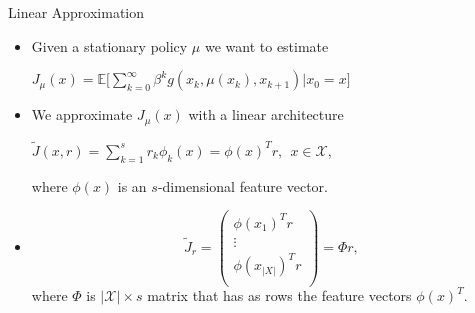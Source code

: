 \documentclass{beamer}
\def\X{{\mathcal X}}
\def\E{{\mathbb E}}
\begin{document}
\begin{frame}{Linear Approximation}

\begin{itemize}
\item Given a stationary policy $\mu$ we want to estimate
\begin{center}
$J_\mu(x) = \E\Big[\sum\limits_{k=0}^\infty \beta^k g(x_k, \mu(x_k), x_{k+1})| x_0 = x \Big]$
\end{center}




\item We approximate $J_\mu(x)$ with a linear architecture 
\begin{center}
$
\tilde J(x, r) = \sum\limits_{k=1}^s r_k \phi_k(x) = \phi(x)^T r,~~x\in \X
  $,
 \end{center} 
  where $\phi(x)$ is an $s$-dimensional feature vector.

\item $$\tilde J_r = \left(
                      \begin{array}{c}
                        \phi(x_1)^T r \\
                        \vdots \\
                        \phi(x_{|X|})^T r \\
                      \end{array}
                    \right)
=\Phi r,$$ where $\Phi$ is $|\X|\times s$ matrix that has as rows the feature vectors $\phi(x)^T$.

    \end{itemize}

\end{frame}
\end{document}
